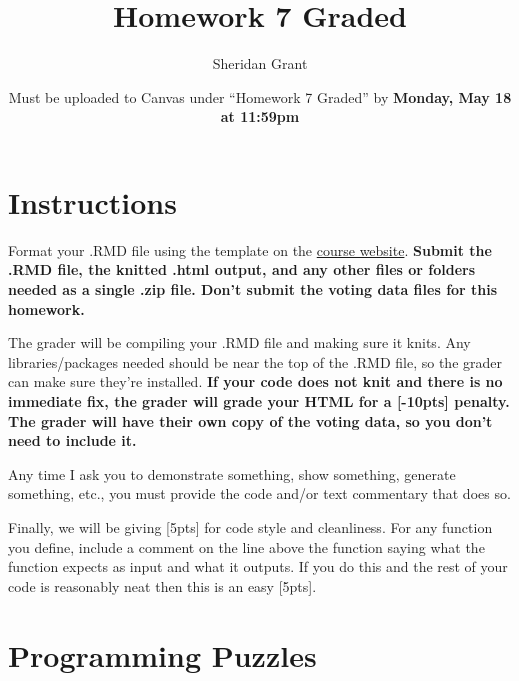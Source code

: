 \documentclass[12pt]{article}
\title{Homework 7 Graded}
\author{Sheridan Grant}
\date{Must be uploaded to Canvas under ``Homework 7 Graded'' by \textbf{Monday, May 18 at 11:59pm}}
\begin{document}
\sloppy

\maketitle

\section*{Instructions}

Format your .RMD file using the template on the \href{https://sheridanlgrant.github.io/teaching/STAT302_SPR2020}{course website}. \textbf{Submit the .RMD file, the knitted .html output, and any other files or folders needed as a single .zip file. Don't submit the voting data files for this homework.}

The grader will be compiling your .RMD file and making sure it knits. Any libraries/packages needed should be near the top of the .RMD file, so the grader can make sure they're installed. \textbf{If your code does not knit and there is no immediate fix, the grader will grade your HTML for a [-10pts] penalty. The grader will have their own copy of the voting data, so you don't need to include it.}

Any time I ask you to demonstrate something, show something, generate something, etc., you must provide the code and/or text commentary that does so.

Finally, we will be giving [5pts] for code style and cleanliness. For any function you define, include a comment on the line above the function saying what the function expects as input and what it outputs. If you do this and the rest of your code is reasonably neat then this is an easy [5pts].

\section{Programming Puzzles}
\end{document}
